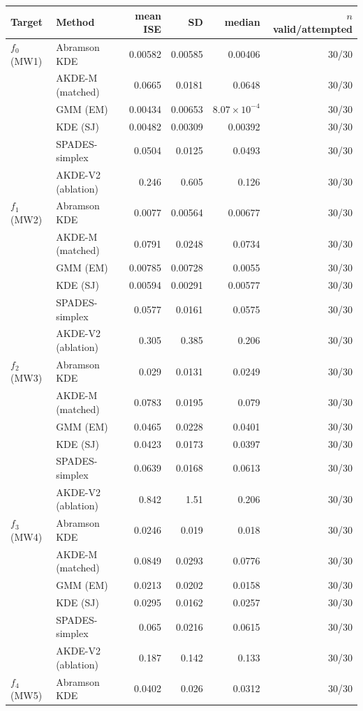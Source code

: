 \begin{tabular}{llrrrr}
\toprule
Target & Method & mean ISE & SD & median & $n$ valid/attempted \\
\midrule
$f_{0}$ (MW1) & Abramson KDE & 0.00582 & 0.00585 & 0.00406 & 30/30 \\
 & AKDE-M (matched) & 0.0665 & 0.0181 & 0.0648 & 30/30 \\
 & GMM (EM) & 0.00434 & 0.00653 & $8.07\times10^{-4}$ & 30/30 \\
 & KDE (SJ) & 0.00482 & 0.00309 & 0.00392 & 30/30 \\
 & SPADES-simplex & 0.0504 & 0.0125 & 0.0493 & 30/30 \\
 & AKDE-V2 (ablation) & 0.246 & 0.605 & 0.126 & 30/30 \\
$f_{1}$ (MW2) & Abramson KDE & 0.0077 & 0.00564 & 0.00677 & 30/30 \\
 & AKDE-M (matched) & 0.0791 & 0.0248 & 0.0734 & 30/30 \\
 & GMM (EM) & 0.00785 & 0.00728 & 0.0055 & 30/30 \\
 & KDE (SJ) & 0.00594 & 0.00291 & 0.00577 & 30/30 \\
 & SPADES-simplex & 0.0577 & 0.0161 & 0.0575 & 30/30 \\
 & AKDE-V2 (ablation) & 0.305 & 0.385 & 0.206 & 30/30 \\
$f_{2}$ (MW3) & Abramson KDE & 0.029 & 0.0131 & 0.0249 & 30/30 \\
 & AKDE-M (matched) & 0.0783 & 0.0195 & 0.079 & 30/30 \\
 & GMM (EM) & 0.0465 & 0.0228 & 0.0401 & 30/30 \\
 & KDE (SJ) & 0.0423 & 0.0173 & 0.0397 & 30/30 \\
 & SPADES-simplex & 0.0639 & 0.0168 & 0.0613 & 30/30 \\
 & AKDE-V2 (ablation) & 0.842 & 1.51 & 0.206 & 30/30 \\
$f_{3}$ (MW4) & Abramson KDE & 0.0246 & 0.019 & 0.018 & 30/30 \\
 & AKDE-M (matched) & 0.0849 & 0.0293 & 0.0776 & 30/30 \\
 & GMM (EM) & 0.0213 & 0.0202 & 0.0158 & 30/30 \\
 & KDE (SJ) & 0.0295 & 0.0162 & 0.0257 & 30/30 \\
 & SPADES-simplex & 0.065 & 0.0216 & 0.0615 & 30/30 \\
 & AKDE-V2 (ablation) & 0.187 & 0.142 & 0.133 & 30/30 \\
$f_{4}$ (MW5) & Abramson KDE & 0.0402 & 0.026 & 0.0312 & 30/30 \\

\end{tabular}
